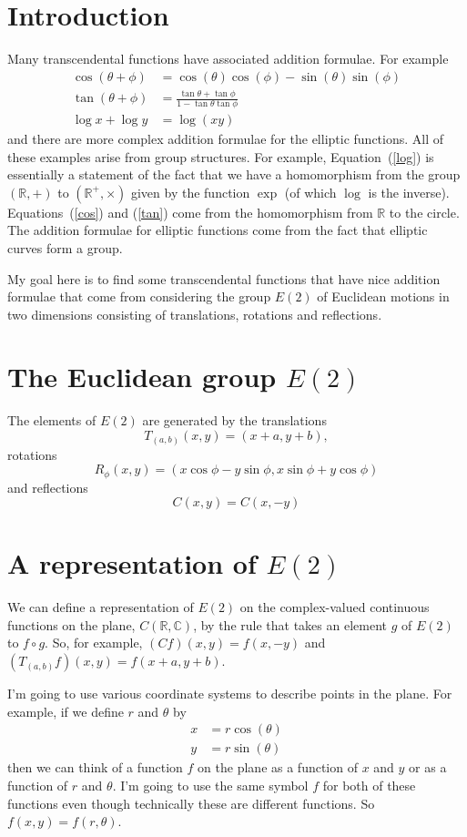 \documentclass{article}
\begin{document}
\section{Introduction}
Many transcendental functions have associated addition formulae.
For example
\begin{align}
\cos(\theta+\phi) & = \cos(\theta)\cos(\phi)-\sin(\theta)\sin(\phi) \label{cos} \\
\tan(\theta+\phi) &= \frac{\tan\theta+\tan\phi}{1-\tan\theta\tan\phi} \label{tan} \\
\log x+\log y &= \log(xy) \label{log}
\end{align}
and there are more complex addition formulae for the elliptic functions.
All of these examples arise from group structures.
For example, Equation~(\ref{log}) is essentially a statement of the fact that we have a homomorphism from the group $(\mathbb{R},+)$ to $(\mathbb{R}^+,\times)$ given by the function $\exp$ (of which $\log$ is the inverse).
Equations~(\ref{cos}) and (\ref{tan}) come from the homomorphism from $\mathbb{R}$ to the circle.
The addition formulae for elliptic functions come from the fact that elliptic curves form a group.

My goal here is to find some transcendental functions that have nice addition formulae that come from considering the group $E(2)$ of Euclidean motions in two dimensions consisting of translations, rotations and reflections.

\section{The Euclidean group $E(2)$}
The elements of $E(2)$ are generated by the translations
\[
T_{(a,b)}(x,y) = (x+a,y+b),
\]
rotations
\[
R_{\phi}(x,y) = (x\cos\phi-y\sin\phi,x\sin\phi+y\cos\phi)
\]
and reflections
\[
C(x,y) = C(x,-y)
\]

\section{A representation of $E(2)$}
We can define a representation of $E(2)$ on the complex-valued continuous functions on the plane, $C(\mathbb{R},\mathbb{C})$,
by the rule that takes an element $g$ of $E(2)$ to $f \circ g$.
So, for example, $(Cf)(x,y) = f(x,-y)$ and $(T_{(a,b)}f)(x,y) = f(x+a,y+b)$.

I'm going to use various coordinate systems to describe points in the plane.
For example, if we define $r$ and $\theta$ by
\begin{align*}
x & = r\cos(\theta) \\
y & = r\sin(\theta) 
\end{align*}
then we can think of a function $f$ on the plane as a function of $x$ and $y$ or as a function of $r$ and $\theta$.
I'm going to use the same symbol $f$ for both of these functions even though technically these are different functions.
So $f(x,y) = f(r,\theta)$.
\end{document}
